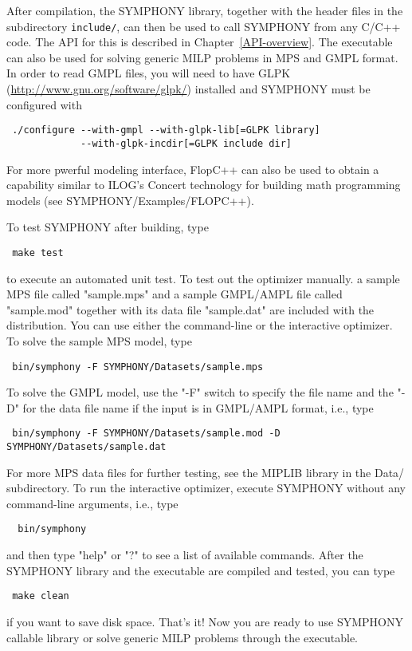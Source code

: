 After compilation, the SYMPHONY library, together with the header files in the
subdirectory \texttt{include/}, can then be used to call SYMPHONY from any
C/C++ code. The API for this is described in Chapter~\ref{API-overview}. The
executable can also be used for solving generic MILP problems in MPS and GMPL
format. In order to read GMPL files, you will need to have GLPK 
(\url{http://www.gnu.org/software/glpk/}) installed and
SYMPHONY must be configured with
{\color{Brown}
\begin{verbatim}
 ./configure --with-gmpl --with-glpk-lib[=GLPK library] 
             --with-glpk-incdir[=GLPK include dir] 
\end{verbatim}
}
For more pwerful modeling interface, FlopC++ can also be used to obtain a
capability similar to ILOG's Concert technology for building math programming
models (see SYMPHONY/Examples/FLOPC++). 

To test SYMPHONY after building, type
{\color{Brown}
\begin{verbatim}
 make test
\end{verbatim}
}
to execute an automated unit test. To test out the optimizer manually. a
sample MPS file called "sample.mps" and a sample GMPL/AMPL file called
"sample.mod" together with its data file "sample.dat" are included with the
distribution. You can use either the command-line or the interactive
optimizer. To solve the sample MPS model, type 
{\color{Brown}
\begin{verbatim}
 bin/symphony -F SYMPHONY/Datasets/sample.mps
\end{verbatim}
}
To solve the GMPL model, use the "-F" switch to specify the file
name and the "-D" for the data file name if the input is in GMPL/AMPL format,
i.e., type
{\color{Brown}
\begin{verbatim}
 bin/symphony -F SYMPHONY/Datasets/sample.mod -D SYMPHONY/Datasets/sample.dat
\end{verbatim}}
For more MPS data files for further testing, see the MIPLIB library in the
Data/ subdirectory. To run the interactive optimizer, execute SYMPHONY without
any command-line arguments, i.e., type
{\color{Brown}
\begin{verbatim}
  bin/symphony 
\end{verbatim}}
and then type "help" or "?" to see a list of available commands.
After the SYMPHONY library and the executable are compiled and tested, you
can type
{\color{Brown}
\begin{verbatim}
 make clean 
\end{verbatim}}
if you want to save disk space. That's it! Now you are ready to use SYMPHONY
callable library or solve generic MILP problems through the executable.

